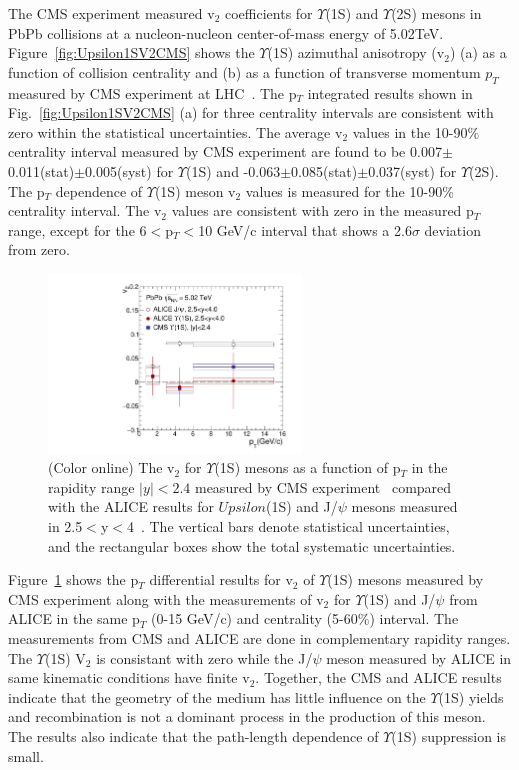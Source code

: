 The CMS experiment measured v$_{2}$ coefficients for $\Upsilon$(1S) and $\Upsilon$(2S) mesons in PbPb collisions
at a nucleon-nucleon center-of-mass energy of 5.02TeV. Figure~\ref{fig:Upsilon1SV2CMS} shows the $\Upsilon$(1S) azimuthal
anisotropy (v$_{2}$) (a) as a function of collision centrality and (b) as a function of transverse momentum $p_{T}$ measured
by CMS experiment at LHC~\cite{CMS:2020efs}. The p$_{T}$ integrated results
shown in Fig.~\ref{fig:Upsilon1SV2CMS} (a) for three centrality intervals are consistent with zero within the statistical
uncertainties. The average v$_{2}$ values in the 10-90$\%$ centrality interval measured by CMS experiment are found to
be 0.007$\pm$0.011(stat)$\pm$0.005(syst) for $\Upsilon$(1S) and -0.063$\pm$0.085(stat)$\pm$0.037(syst) for $\Upsilon$(2S).   
The p$_{T}$ dependence of $\Upsilon$(1S) meson v$_{2}$ values is measured for the 10-90$\%$ centrality interval.
The v$_{2}$ values are consistent with zero in the measured p$_T$ range, except for the 6$<$p$_{T}<$10 GeV/c interval that
shows a 2.6$\sigma$ deviation from zero. 

\begin{figure}
  \begin{center}
\includegraphics[width=0.6\textwidth]{Figures/ExpOverview/Fig_CMS_ALICE_Y1S_5TeV_V2.pdf}
\caption{(Color online) The v$_{2}$ for $\Upsilon$(1S) mesons as a function of p$_{T}$ in the
  rapidity range $|y|<2.4$ measured by
  CMS experiment~\cite{CMS:2020efs} compared with the ALICE results for $Upsilon$(1S) and J/$\psi$ mesons measured
  in 2.5$<$y$<$4~\cite{ALICE:2019pox}. The vertical bars denote statistical uncertainties,
  and the rectangular boxes show the total systematic uncertainties.
}
\label{fig:Upsilon1SV2Compare}
\end{center}
\end{figure}

Figure~\ref{fig:Upsilon1SV2Compare} shows the p$_{T}$ differential results for v$_{2}$ of $\Upsilon$(1S)
mesons measured by CMS experiment along with the measurements of v$_{2}$ for $\Upsilon$(1S) and J/$\psi$
from ALICE in the same p$_{T}$ (0-15 GeV/c) and centrality (5-60$\%$) interval. The measurements from CMS
and ALICE are done in complementary rapidity ranges. The $\Upsilon$(1S) V$_{2}$ is consistant with zero while
the J/$\psi$ meson measured by ALICE in same kinematic conditions have finite v$_{2}$. Together, the CMS and ALICE
results indicate that the geometry of the medium has little influence on the $\Upsilon$(1S) yields and recombination is
not a dominant process in the production of this meson. The results also indicate that the path-length dependence of
$\Upsilon$(1S) suppression is small.



